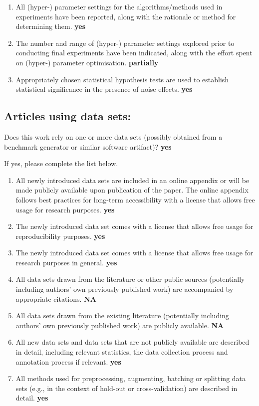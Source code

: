 \documentclass[manuscript, screen, review]{jair}
\begin{document}
\begin{enumerate}
    \textbf{yes}
    \item
    All (hyper-) parameter settings for
    the algorithms/methods used in experiments have been reported, along with the rationale or method for determining them.
    \textbf{yes}
    \item
    The number and range of (hyper-) parameter settings explored prior to conducting final experiments have been indicated, along with the effort spent on (hyper-) parameter optimisation.
    \textbf{partially}
    \item
    Appropriately chosen statistical hypothesis tests are used to establish statistical significance
    in the presence of noise effects.
    \textbf{yes}
\end{enumerate}

\subsection*{Articles using data sets:}
Does this work rely on one or more data sets (possibly obtained from a benchmark generator or similar software artifact)?
\textbf{yes}

If yes, please complete the list below.
\begin{enumerate}
    \item
    All newly introduced data sets
    are included in an online appendix
    or will be made publicly available upon publication of the paper.
    The online appendix follows best practices for long-term accessibility with a license
    that allows free usage for research purposes.
    \textbf{yes}
    \item The newly introduced data set comes with a license that
    allows free usage for reproducibility purposes.
    \textbf{yes}
    \item The newly introduced data set comes with a license that
    allows free usage for research purposes in general.
    \textbf{yes}
    \item All data sets drawn from the literature or other public sources (potentially including authors' own previously published work) are accompanied by appropriate citations.
    \textbf{NA}
    \item All data sets drawn from the existing literature (potentially including authors' own previously published work) are publicly available. \textbf{NA}
    \item All new data sets and data sets that are not publicly available are described in detail, including relevant statistics, the data collection process and annotation process if relevant.
    \textbf{yes}
    \item
    All methods used for preprocessing, augmenting, batching or splitting data sets (e.g., in the context of hold-out or cross-validation)
    are described in detail. \textbf{yes}
\end{enumerate}
\end{document}
